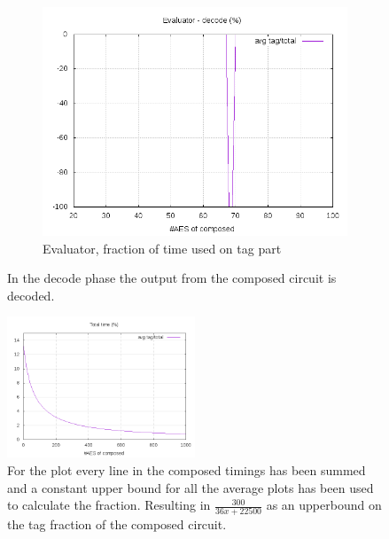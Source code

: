 \documentclass[10pt,a4paper]{article}
\begin{document}
\begin{figure}[h]
\begin{subfigure}[t]{0.3\textwidth}
        \includegraphics[width=\textwidth]{eval_decode_frac}
        \caption{Evaluator, fraction of time used on tag part}
    \end{subfigure}
    \caption{In the decode phase the output from the composed circuit is decoded.}
    \label{data decode}
\end{figure}

\begin{figure}[h]
    \centering
    \includegraphics[width=0.5\textwidth]{total_frac}
    \caption{For the plot every line in the composed timings has been summed and a constant upper bound for all the average plots has been used to calculate the fraction. Resulting in $\frac{300}{36x+22500}$ as an upperbound on the tag fraction of the composed circuit.}
    \label{data total}
\end{figure}
\end{document}
